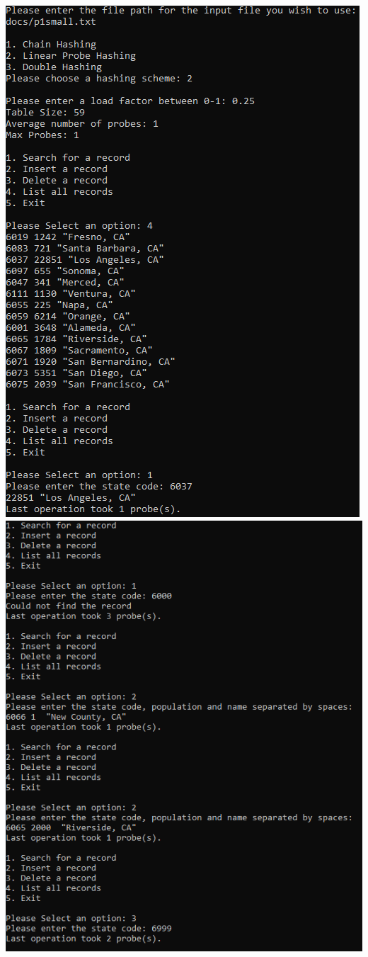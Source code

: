 \documentclass[titlepage]{article}
\begin{document}
\includegraphics[]{Small_Input/LF_0_25/LinearProbe_1.png} \newpage
\includegraphics[]{Small_Input/LF_0_25/LinearProbe_2.png}\newpage 
\end{document}
